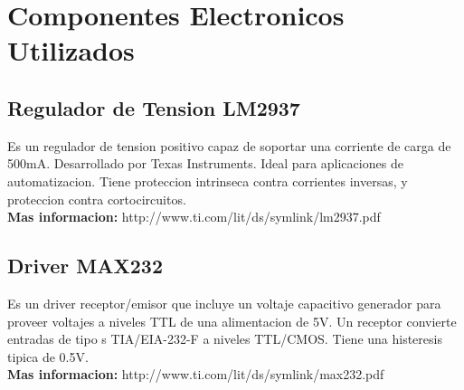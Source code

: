 \section{Componentes Electronicos Utilizados} %
\label{sec:componentes_electronicos_utilizados}







\subsection{Regulador de Tension LM2937} %
\label{sub:regulador_de_tension_lm2937}

Es un regulador de tension positivo capaz de soportar una corriente de carga de 500mA. Desarrollado por Texas Instruments. Ideal para aplicaciones de automatizacion. Tiene proteccion intrinseca contra corrientes inversas, y proteccion contra cortocircuitos. \\

\textbf{Mas informacion:} http://www.ti.com/lit/ds/symlink/lm2937.pdf


\subsection{Driver MAX232} %
\label{sub:driver_max232}

Es un driver receptor/emisor que incluye un voltaje capacitivo generador para proveer voltajes a niveles TTL de una alimentacion de 5V. Un receptor convierte entradas de tipo s TIA/EIA-232-F a niveles TTL/CMOS. Tiene una histeresis tipica de 0.5V. \\


\textbf{Mas informacion:} http://www.ti.com/lit/ds/symlink/max232.pdf






